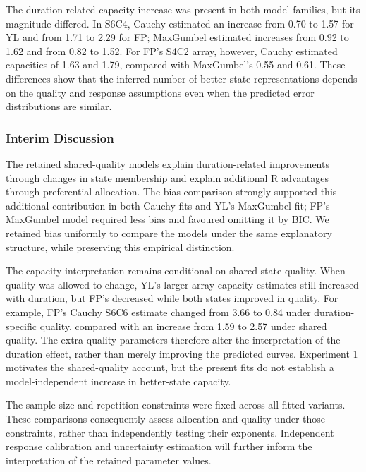 The duration-related capacity increase was present in both model families, but its magnitude differed. In S6C4, Cauchy estimated an increase from 0.70 to 1.57 for YL and from 1.71 to 2.29 for FP; MaxGumbel estimated increases from 0.92 to 1.62 and from 0.82 to 1.52. For FP's S4C2 array, however, Cauchy estimated capacities of 1.63 and 1.79, compared with MaxGumbel's 0.55 and 0.61. These differences show that the inferred number of better-state representations depends on the quality and response assumptions even when the predicted error distributions are similar.

\subsubsection{Interim Discussion}

The retained shared-quality models explain duration-related improvements through changes in state membership and explain additional R advantages through preferential allocation. The bias comparison strongly supported this additional contribution in both Cauchy fits and YL's MaxGumbel fit; FP's MaxGumbel model required less bias and favoured omitting it by BIC. We retained bias uniformly to compare the models under the same explanatory structure, while preserving this empirical distinction.

The capacity interpretation remains conditional on shared state quality. When quality was allowed to change, YL's larger-array capacity estimates still increased with duration, but FP's decreased while both states improved in quality. For example, FP's Cauchy S6C6 estimate changed from 3.66 to 0.84 under duration-specific quality, compared with an increase from 1.59 to 2.57 under shared quality. The extra quality parameters therefore alter the interpretation of the duration effect, rather than merely improving the predicted curves. Experiment 1 motivates the shared-quality account, but the present fits do not establish a model-independent increase in better-state capacity.


The sample-size and repetition constraints were fixed across all fitted variants. These comparisons consequently assess allocation and quality under those constraints, rather than independently testing their exponents. Independent response calibration and uncertainty estimation will further inform the interpretation of the retained parameter values.


